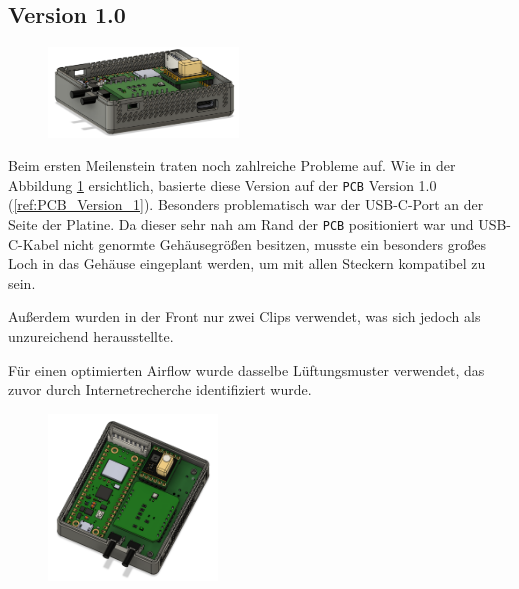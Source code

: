\begin{inhalt}
\clearpage

\section{Version 1.0}
\label{ref:gehaeuse_1_0}

\begin{figure}[!htb]
\centering
\includegraphics[width=0.45\textwidth]{files/Thomas/pics/geheause/1.0/gehaeuse_side.png}
\caption[Bildbezeichnung für Abbildungsverzeichnis]{}
\label{fig:gehaeuse_side_v1_0}
\end{figure}

Beim ersten Meilenstein traten noch zahlreiche Probleme auf. Wie in der Abbildung \ref{fig:gehaeuse_side_v1_0} ersichtlich, basierte diese Version auf der \texttt{PCB} Version 1.0 (\ref{ref:PCB_Version_1}).  
Besonders problematisch war der USB-C-Port an der Seite der Platine. Da dieser sehr nah am Rand der \texttt{PCB} positioniert war und USB-C-Kabel nicht genormte Gehäusegrößen besitzen,  
musste ein besonders großes Loch in das Gehäuse eingeplant werden, um mit allen Steckern kompatibel zu sein.  

\vspace{0.15cm}

Außerdem wurden in der Front nur zwei Clips verwendet, was sich jedoch als unzureichend herausstellte.  


\vspace{0.15cm}

Für einen optimierten Airflow wurde dasselbe Lüftungsmuster verwendet, das zuvor durch Internetrecherche identifiziert wurde.



\begin{figure}[!htb]
\centering
\includegraphics[width=0.4\textwidth]{files/Thomas/pics/geheause/1.0/gehaeuse_top.png}
\caption[Bildbezeichnung für Abbildungsverzeichnis]{}
\label{fig:gehaeuse_top_1_0}
\end{figure}



\end{inhalt}
